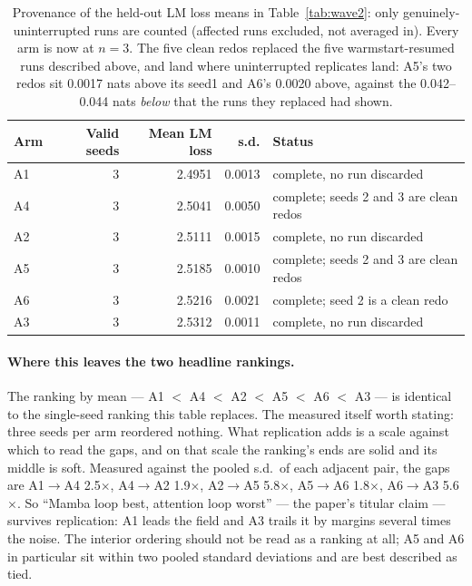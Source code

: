 \documentclass[11pt,a4paper]{article}
\begin{document}
\begin{table}[h]
\centering
\begin{tabular}{lrrrl}
\toprule
Arm & Valid seeds & Mean LM loss & s.d. & Status \\
\midrule
A1 & 3 & 2.4951 & 0.0013 & complete, no run discarded \\
A4 & 3 & 2.5041 & 0.0050 & complete; seeds 2 and 3 are clean redos \\
A2 & 3 & 2.5111 & 0.0015 & complete, no run discarded \\
A5 & 3 & 2.5185 & 0.0010 & complete; seeds 2 and 3 are clean redos \\
A6 & 3 & 2.5216 & 0.0021 & complete; seed 2 is a clean redo \\
A3 & 3 & 2.5312 & 0.0011 & complete, no run discarded \\
\bottomrule
\end{tabular}
\caption{Provenance of the held-out LM loss means in Table~\ref{tab:wave2}: only
genuinely-uninterrupted runs are counted (affected runs excluded, not averaged in). Every arm is now
at $n=3$. The five clean redos replaced the five warmstart-resumed runs described above, and land
where uninterrupted replicates land: A5's two redos sit 0.0017 nats above its seed1 and A6's 0.0020
above, against the 0.042--0.044 nats \emph{below} that the runs they replaced had shown.}
\label{tab:wave2seeds}
\end{table}

\paragraph{Where this leaves the two headline rankings.} The ranking by mean --- A1 $<$ A4 $<$ A2
$<$ A5 $<$ A6 $<$ A3 --- is identical to the single-seed ranking this table replaces. The measured
itself worth stating: three seeds per arm reordered nothing. What replication adds is a scale against
which to read the gaps, and on that scale the ranking's ends are solid and its middle is soft.
Measured against the pooled s.d.\ of each adjacent pair, the gaps are A1$\to$A4 2.5$\times$,
A4$\to$A2 1.9$\times$, A2$\to$A5 5.8$\times$, A5$\to$A6 1.8$\times$, A6$\to$A3 5.6$\times$. So
``Mamba loop best, attention loop worst'' --- the paper's titular claim --- survives replication:
A1 leads the field and A3 trails it by margins several times the noise. The interior ordering should
not be read as a ranking at all; A5 and A6 in particular sit within two pooled standard deviations
and are best described as tied.
\end{document}
